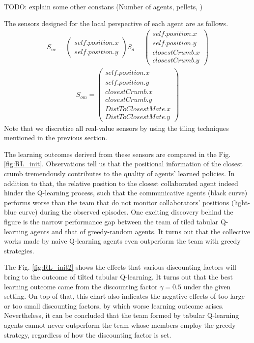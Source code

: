 \documentclass[conference]{IEEEtran}
\begin{document}
TODO: explain some other constans (Number of agents, pellets, )


The sensors designed for the local perspective of each agent are as follows. 
\begin{align}
    S_{nc} = \left( \begin{array}{c}
      self.position.x \\
      self.position.y 
  \end{array} \right)
    S_{d} = \left( \begin{array}{c}
      self.position.x \\
      self.position.y \\
      closestCrumb.x \\
      closestCrumb.y 
  \end{array} \right)
    \nonumber
\end{align}
\begin{align}
        S_{om} = \left( \begin{array}{c}
      self.position.x \\
      self.position.y \\
      closestCrumb.x \\
      closestCrumb.y  \\
      DistToClosestMate.x \\
      DistToClosestMate.y 
  \end{array} \right)
        \nonumber
\end{align}
Note that we discretize all real-value sensors by using the tiling
techniques mentioned in the previous section. 

The learning outcomes derived from these sensors are compared in the
Fig. \ref{fig:RL_init}. 
Observations tell us that the positional information of the closest crumb
tremendously contributes to the quality of agents' learned policies. 
In addition to that, the relative position to the closest collaborated agent
indeed hinder the Q-learning process, such that the communicative agents (black
curve) performs worse than the team that do not monitor collaborators'
positions (light-blue curve) during the observed episodes. One exciting
discovery behind the figure is the narrow performance gap between the team of
tiled tabular Q-learning agents and that of greedy-random agents. It turns out
that the collective works made by naive Q-learning agents even outperform the
team with greedy strategies.



The Fig. \ref{fig:RL_init2} shows the effects that various discounting factors
will bring to the outcome of tilted tabular Q-learning. It turns out that the
best learning outcome came from the discounting factor $\gamma = 0.5$ under
the given setting. On top of that, this chart also indicates the negative
effects of too large or too small discounting factors, by which worse learning
outcome arises. Nevertheless, it can be concluded that the team formed by
tabular Q-learning agents cannot never outperform the team whose members
employ the greedy strategy, regardless of how the discounting factor is set.
\end{document}
